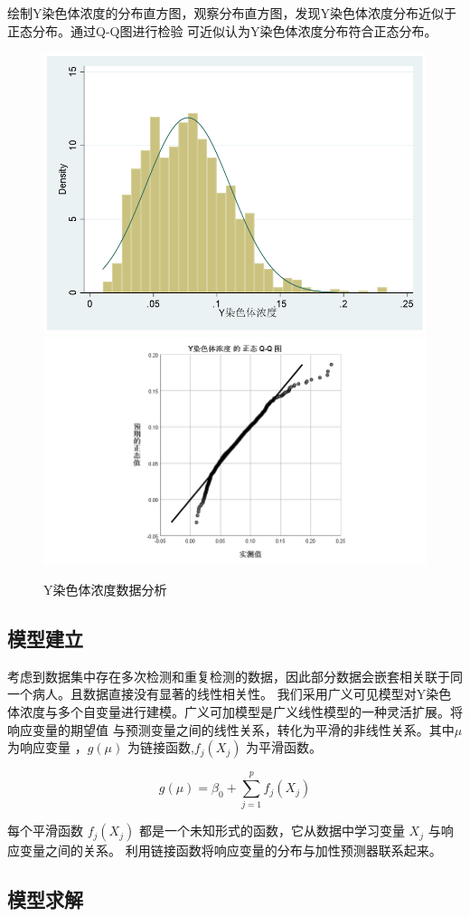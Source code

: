 \documentclass[withoutpreface,notoc]{cumcmthesis}
\begin{document}
	绘制Y染色体浓度的分布直方图，观察分布直方图，发现Y染色体浓度分布近似于正态分布。通过Q-Q图进行检验
	可近似认为Y染色体浓度分布符合正态分布。
	\begin{figure}[ht]
		\centering
		{\includegraphics[width=.45\textwidth]{figures/Y染色体浓度分布.png}}
		\hfill %
		{\includegraphics[width=.45\textwidth]{figures/Y染色体浓度正态.png}}
		\caption{Y染色体浓度数据分析}
		\label{fig:Y染色体浓度}
	\end{figure}


	\subsection{模型建立}
	考虑到数据集中存在多次检测和重复检测的数据，因此部分数据会嵌套相关联于同一个病人。且数据直接没有显著的线性相关性。
	我们采用广义可见模型对Y染色体浓度与多个自变量进行建模。广义可加模型是广义线性模型的一种灵活扩展。将响应变量的期望值
	与预测变量之间的线性关系，转化为平滑的非线性关系。其中$\mu $为响应变量 ，$g(\mu)$ 为链接函数,$f_{j}(X_{j})$ 为平滑函数。

	\begin{equation}
	g(\mu) = \beta_0 + \sum_{j=1}^{p} f_{j}(X_{j})
	\end{equation}


	每个平滑函数 $f_{j}(X_{j})$ 都是一个未知形式的函数，它从数据中学习变量 $X_{j}$ 与响应变量之间的关系。
	利用链接函数将响应变量的分布与加性预测器联系起来。





	\subsection{模型求解}
\end{document}
